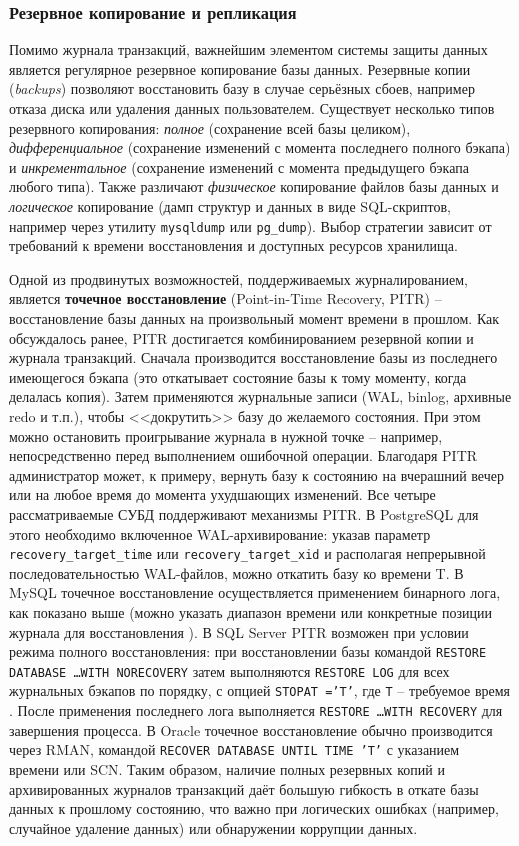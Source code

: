 \subsubsection{Резервное копирование и репликация} 

 Помимо журнала транзакций, важнейшим элементом системы защиты данных является регулярное резервное копирование базы данных. Резервные копии (\textit{backups}) позволяют восстановить базу в случае серьёзных сбоев, например отказа диска или удаления данных пользователем. Существует несколько типов резервного копирования: \textit{полное} (сохранение всей базы целиком), \textit{дифференциальное} (сохранение изменений с момента последнего полного бэкапа) и \textit{инкрементальное} (сохранение изменений с момента предыдущего бэкапа любого типа). Также различают \textit{физическое} копирование файлов базы данных и \textit{логическое} копирование (дамп структур и данных в виде SQL-скриптов, например через утилиту \texttt{mysqldump} или \texttt{pg\_dump}). Выбор стратегии зависит от требований к времени восстановления и доступных ресурсов хранилища. 
 
 Одной из продвинутых возможностей, поддерживаемых журналированием, является \textbf{точечное восстановление} (Point-in-Time Recovery, PITR) – восстановление базы данных на произвольный момент времени в прошлом. Как обсуждалось ранее, PITR достигается комбинированием резервной копии и журнала транзакций. Сначала производится восстановление базы из последнего имеющегося бэкапа (это откатывает состояние базы к тому моменту, когда делалась копия). Затем применяются журнальные записи (WAL, binlog, архивные redo и т.п.), чтобы <<докрутить>> базу до желаемого состояния. При этом можно остановить проигрывание журнала в нужной точке – например, непосредственно перед выполнением ошибочной операции. Благодаря PITR администратор может, к примеру, вернуть базу к состоянию на вчерашний вечер или на любое время до момента ухудшающих изменений. Все четыре рассматриваемые СУБД поддерживают механизмы PITR. В PostgreSQL для этого необходимо включенное WAL-архивирование: указав параметр \texttt{recovery\_target\_time} или \texttt{recovery\_target\_xid} и располагая непрерывной последовательностью WAL-файлов, можно откатить базу ко времени T. В MySQL точечное восстановление осуществляется применением бинарного лога, как показано выше (можно указать диапазон времени или конкретные позиции журнала для восстановления \autocite{Mysqldoc7}). В SQL Server PITR возможен при условии режима полного восстановления: при восстановлении базы командой \texttt{RESTORE DATABASE \ldots WITH NORECOVERY} затем выполняются \texttt{RESTORE LOG} для всех журнальных бэкапов по порядку, с опцией \texttt{STOPAT ='T'}, где \texttt{T} – требуемое время \autocite{MicrosoftLearnSQLserverTransLog}. После применения последнего лога выполняется \texttt{RESTORE \ldots WITH RECOVERY} для завершения процесса. В Oracle точечное восстановление обычно производится через RMAN, командой \texttt{RECOVER DATABASE UNTIL TIME 'T'} с указанием времени или SCN. Таким образом, наличие полных резервных копий и архивированных журналов транзакций даёт большую гибкость в откате базы данных к прошлому состоянию, что важно при логических ошибках (например, случайное удаление данных) или обнаружении коррупции данных. 
 
